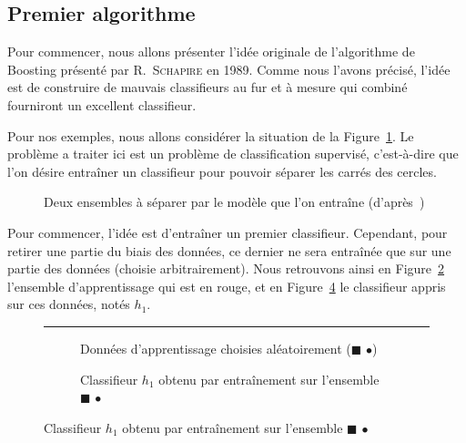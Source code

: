 \subsection{Premier algorithme}
\label{sec:boosting}
Pour commencer, nous allons présenter l'idée originale de l'algorithme de Boosting présenté par R.~\textsc{Schapire} en 1989. Comme nous l'avons précisé, l'idée est de construire de \og mauvais\fg{} classifieurs au fur et à mesure qui combiné fourniront un excellent classifieur.

Pour nos exemples, nous allons considérer la situation de la Figure~\ref{fig:boosting_situation}. Le problème a traiter ici est un problème de classification supervisé, c'est-à-dire que l'on désire entraîner un classifieur pour pouvoir séparer les carrés des cercles.

\begin{figure}[h]
	\begin{margincap}
	  	\centering
		
		\caption[fig:boosting_situation]{Deux ensembles à séparer par le modèle que l'on entraîne (d'après~\cite{bib:elghazel})}
		\label{fig:boosting_situation}
	\end{margincap}
\end{figure}

Pour commencer, l'idée est d'entraîner un premier classifieur. Cependant, pour retirer une partie du biais des données, ce dernier ne sera entraînée que sur une partie des données (choisie arbitrairement). Nous retrouvons ainsi en Figure~\ref{fig:boosting_un_app} l'ensemble d'apprentissage qui est en rouge, et en Figure~\ref{fig:boosting_un_modele} le classifieur appris sur ces données, notés $h_1$.

\begin{figure}[h]
	\begin{margincap}
		\rule{\textwidth}{0pt}
	\caption{Premier modèle appris sur les données (d'après~\cite{bib:elghazel})}
	\end{margincap}
	\begin{subfigure}{.45\textwidth}
		
		\caption{Données d'apprentissage choisies aléatoirement ($\blacksquare$ \large{$\bullet$})}
		\label{fig:boosting_un_app}
	\end{subfigure}\hfill
	\begin{subfigure}{.45\textwidth}
		
		\caption{Classifieur $h_1$ obtenu par entraînement sur l'ensemble $\blacksquare$ \large{$\bullet$}}
		\label{fig:boosting_un_modele}
	\end{subfigure}\hfill
\end{figure}

